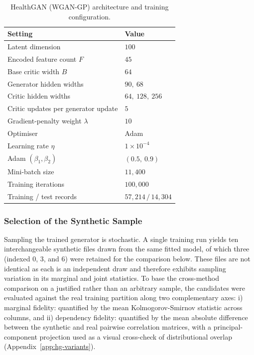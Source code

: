 \begin{table}[h]
\centering
\small
\caption{HealthGAN (WGAN-GP) architecture and training configuration.}
\label{tab:healthgan-hp}
\begin{tabular}{ll}
\toprule
Setting & Value \\
\midrule
Latent dimension & $100$ \\
Encoded feature count $F$ & $45$ \\
Base critic width $B$ & $64$ \\
Generator hidden widths & $90,\ 68$ \\
Critic hidden widths & $64,\ 128,\ 256$ \\
Critic updates per generator update & $5$ \\
Gradient-penalty weight $\lambda$ & $10$ \\
Optimiser & Adam \\
Learning rate $\eta$ & $1\times10^{-4}$ \\
Adam $(\beta_1,\beta_2)$ & $(0.5,\ 0.9)$ \\
Mini-batch size & $11{,}400$ \\
Training iterations & $100{,}000$ \\
Training / test records & $57{,}214 \,/\, 14{,}304$ \\
\bottomrule
\end{tabular}
\end{table}

\subsubsection{Selection of the Synthetic Sample}
\label{sec:methods:healthgan:variants}

Sampling the trained generator is stochastic. A single training run yields
ten interchangeable synthetic files drawn from the same fitted model, of
which three (indexed $0$, $3$, and $6$) were retained for the
comparison below. These files are not identical as each is an
independent draw and therefore exhibits sampling variation in its marginal
and joint statistics. To base the cross-method comparison on a justified
rather than an arbitrary sample, the candidates were evaluated against the
real training partition along two complementary axes: i) marginal fidelity:
quantified by the mean Kolmogorov-Smirnov statistic across columns, and
ii) dependency fidelity: quantified by the mean absolute difference between the
synthetic and real pairwise correlation matrices, with a principal-component
projection used as a visual cross-check of distributional overlap
(Appendix~\ref{app:hg-variants}).

